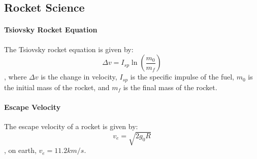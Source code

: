 \documentclass[11pt]{report}
\begin{document}
\subsection{Rocket Science}
\paragraph{Tsiovsky Rocket Equation} The Tsiovsky rocket equation is given by:
\begin{equation}
    \Delta v = I_{sp} \ln \left( \frac{m_0}{m_f} \right)
\end{equation}
, where $\Delta v$ is the change in velocity, $I_{sp}$ is the specific impulse of the fuel, $m_0$ is the initial mass of the rocket, and $m_f$ is the final mass of the rocket.
\paragraph{Escape Velocity} The escape velocity of a rocket is given by:
\begin{equation}
    v_e = \sqrt{2g_0R}
\end{equation}
, on earth, $v_e = 11.2 km/s$.
\end{document}
